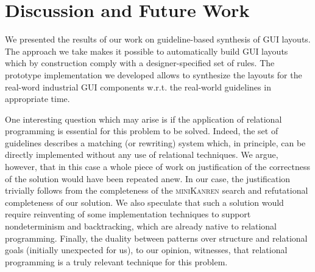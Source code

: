
\section{Discussion and Future Work}

We presented the results of our work on guideline-based synthesis of GUI layouts. The approach we take makes it possible to
automatically build GUI layouts which by construction comply with a designer-specified set of rules. The prototype implementation
we developed allows to synthesize the layouts for the real-word industrial GUI components w.r.t. the real-world guidelines in
appropriate time.

One interesting question which may arise is if the application of relational programming is essential for this problem to be solved. Indeed, the set of guidelines
describes a matching (or rewriting) system which, in principle, can be directly implemented without any use of relational techniques. We argue, however,
that in this case a whole piece of work on justification of the correctness of the solution would have been repeated anew. In our
case, the justification trivially follows from the completeness of the \textsc{miniKanren} search and refutational completeness of our solution. We also speculate
that such a solution would require reinventing of some implementation techniques to support nondeterminism and backtracking, which are already native to relational
programming. Finally, the duality between patterns over structure and relational goals (initially unexpected for us), to our opinion, witnesses, that relational
programming is a truly relevant technique for this problem. %



